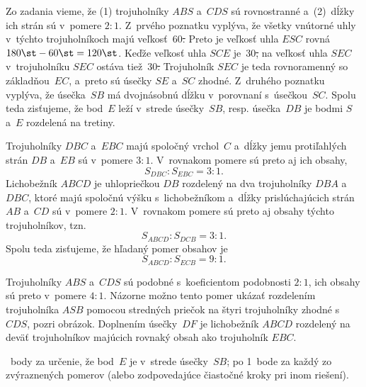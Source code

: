 {%
Zo zadania vieme, že (1) trojuholníky $ABS$ a~$CDS$ sú rovnostranné a~(2)~dĺžky ich strán sú v~pomere $2:1$.
Z~prvého poznatku vyplýva, že všetky vnútorné uhly v~týchto trojuholníkoch majú veľkosť~60\st.
Preto je veľkosť uhla $ESC$ rovná ${180\st-60\st}=120\st$.
Keďže veľkosť uhla $SCE$ je~30\st, na veľkosť uhla $SEC$ v~trojuholníku $SEC$ ostáva tiež~30\st.
Trojuholník $SEC$ je teda rovnoramenný so základňou~$EC$, a~preto sú úsečky $SE$ a~$SC$ zhodné.
Z~druhého poznatku vyplýva, že úsečka~$SB$ má dvojnásobnú dĺžku v~porovnaní s~úsečkou~$SC$.
Spolu teda zisťujeme, že bod~$E$ leží v~strede úsečky~$SB$, resp. úsečka~$DB$ je bodmi $S$ a~$E$ rozdelená na tretiny.
%

Trojuholníky $DBC$ a~$EBC$ majú spoločný vrchol~$C$ a~dĺžky jemu protiľahlých strán $DB$ a~$EB$ sú v~pomere $3:1$.
V~rovnakom pomere sú preto aj ich obsahy,
$$
S_{DBC}:S_{EBC}=3:1.
$$
Lichobežník $ABCD$ je uhlopriečkou $DB$ rozdelený na dva trojuholníky $DBA$ a~$DBC$, ktoré majú spoločnú výšku s~lichobežníkom a~dĺžky prislúchajúcich strán $AB$ a~$CD$ sú v~pomere $2:1$.
V~rovnakom pomere sú preto aj obsahy týchto trojuholníkov, tzn.
$$
S_{ABCD}:S_{DCB}=3:1.
$$
Spolu teda zisťujeme, že hľadaný pomer obsahov je
$$
S_{ABCD}:S_{ECB}=9:1.
$$

\poznamka
Trojuholníky $ABS$ a~$CDS$ sú podobné s~koeficientom podobnosti $2:1$, ich obsahy sú preto v~pomere $4:1$.
Názorne možno tento pomer ukázať rozdelením trojuholníka $ASB$ pomocou stredných priečok na štyri trojuholníky zhodné s~$CDS$, pozri obrázok.
Doplnením úsečky~$DF$ je lichobežník $ABCD$ rozdelený na deväť trojuholníkov majúcich rovnaký obsah ako trojuholník $EBC$.
%

~body za určenie, že bod~$E$ je v~strede úsečky~$SB$;
po 1~bode za každý zo zvýraznených pomerov (alebo zodpovedajúce čiastočné kroky pri inom riešení).
\endhodnotenie}


